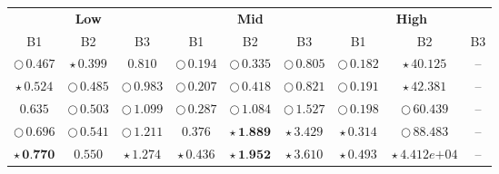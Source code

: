 \documentclass[
]{article}
\begin{document}
\begin{table}[!h]
\centering
\begin{tabular}[t]{ccccccccc}
\toprule
\multicolumn{3}{c}{\textbf{Low}} & \multicolumn{3}{c}{\textbf{Mid}} & \multicolumn{3}{c}{\textbf{High}} \\
\cmidrule(l{3pt}r{3pt}){1-3} \cmidrule(l{3pt}r{3pt}){4-6} \cmidrule(l{3pt}r{3pt}){7-9}
B1 & B2 & B3 & B1 & B2 & B3 & B1 & B2 & B3\\
\midrule
\cellcolor[HTML]{F5C710}$\bigcirc\,\textit{0.467}$ & \cellcolor[HTML]{F5C710}$\star\,\textit{0.399}$ & \cellcolor[HTML]{FFFFFF}$0.810$ & \cellcolor[HTML]{DF536B}$\bigcirc\,\textit{0.194}$ & \cellcolor[HTML]{DF536B}$\bigcirc\,\textit{0.335}$ & \cellcolor[HTML]{DF536B}$\bigcirc\,\textit{0.805}$ & \cellcolor[HTML]{2297E6}$\bigcirc\,\textit{0.182}$ & \cellcolor[HTML]{2297E6}$\star\,\textit{40.125}$ & --\\
\cellcolor[HTML]{F5C710}$\star\,\textit{0.524}$ & \cellcolor[HTML]{F5C710}$\bigcirc\,\textit{0.485}$ & \cellcolor[HTML]{F5C710}$\bigcirc\,\textit{0.983}$ & \cellcolor[HTML]{2297E6}$\bigcirc\,\textit{0.207}$ & \cellcolor[HTML]{2297E6}$\bigcirc\,\textit{0.418}$ & \cellcolor[HTML]{2297E6}$\bigcirc\,\textit{0.821}$ & \cellcolor[HTML]{DF536B}$\bigcirc\,\textit{0.191}$ & \cellcolor[HTML]{DF536B}$\star\,\textit{42.381}$ & --\\
\cellcolor[HTML]{FFFFFF}$0.635$ & \cellcolor[HTML]{2297E6}$\bigcirc\,\textit{0.503}$ & \cellcolor[HTML]{2297E6}$\bigcirc\,\textit{1.099}$ & \cellcolor[HTML]{F5C710}$\bigcirc\,\textit{0.287}$ & \cellcolor[HTML]{F5C710}$\bigcirc\,\textit{1.084}$ & \cellcolor[HTML]{F5C710}$\bigcirc\,\textit{1.527}$ & \cellcolor[HTML]{F5C710}$\bigcirc\,\textit{0.198}$ & \cellcolor[HTML]{DF536B}$\bigcirc\,\textit{60.439}$ & --\\
\cellcolor[HTML]{2297E6}$\bigcirc\,\textit{0.696}$ & \cellcolor[HTML]{DF536B}$\bigcirc\,\textit{0.541}$ & \cellcolor[HTML]{DF536B}$\bigcirc\,\textit{1.211}$ & \cellcolor[HTML]{FFFFFF}$0.376$ & \cellcolor[HTML]{DF536B}$\star\,\textbf{1.889}$ & \cellcolor[HTML]{2297E6}$\star\,\textit{3.429}$ & \cellcolor[HTML]{F5C710}$\star\,\textit{0.314}$ & \cellcolor[HTML]{2297E6}$\bigcirc\,\textit{88.483}$ & --\\
\cellcolor[HTML]{F5C710}$\star\,\textbf{0.770}$ & \cellcolor[HTML]{FFFFFF}$0.550$ & \cellcolor[HTML]{F5C710}$\star\,\textit{1.274}$ & \cellcolor[HTML]{F5C710}$\star\,\textit{0.436}$ & \cellcolor[HTML]{2297E6}$\star\,\textbf{1.952}$ & \cellcolor[HTML]{DF536B}$\star\,\textit{3.610}$ & \cellcolor[HTML]{2297E6}$\star\,\textit{0.493}$ & \cellcolor[HTML]{F5C710}$\star\,\textit{4.412e+04}$ & --\\

\end{tabular}
\end{table}
\end{document}
